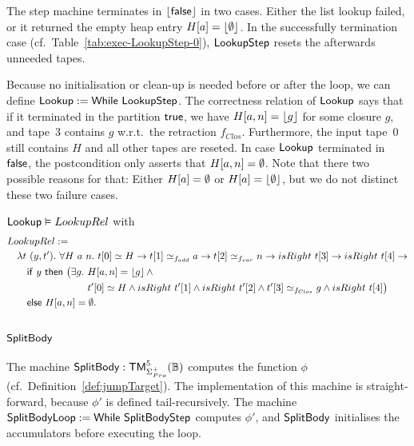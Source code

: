 The step machine terminates in $\left\lfloor {\ensuremath{\mathsf{false}}} \right\rfloor$ in two cases.  Either the list lookup failed, or it returned the empty heap entry $H[a]=\left\lfloor {\emptyset} \right\rfloor$.  In
the successfully termination case (cf.\ Table~\ref{tab:exec-LookupStep-0}), $\mathsf{LookupStep}$ resets the afterwards unneeded tapes.

Because no initialisation or clean-up is needed before or after the loop, we can define $\mathsf{Lookup} := \mathsf{While}~\mathsf{LookupStep}$.  The correctness
relation of $\mathsf{Lookup}$ says that if it terminated in the partition $\mathsf{true}$, we have $H[a,n] = \left\lfloor {g} \right\rfloor$ for some closure $g$, and tape~$3$ contains
$g$ w.r.t.\ the retraction $f_{Clos}$.  Furthermore, the input tape~$0$ still contains $H$ and all other tapes are reseted.  In case $\mathsf{Lookup}$
terminated in $\mathsf{false}$, the postcondition only asserts that $H[a,n]=\emptyset$.  Note that there two possible reasons for that: Either $H[a]=\emptyset$ or
$H[a]=\left\lfloor {\emptyset} \right\rfloor$, but we do not distinct these two failure cases.

\begin{lemma}
  \label{lem:Lookup_Realise}
  $\mathsf{Lookup} \mathrel{\vDash} LookupRel$
  with
  \small
  \begin{alignat*}{1}
    & LookupRel := \\
    &\quad \lambda t~(y, t').~\forall H~a~n.~ t[0] \simeq H \rightarrow t[1] \simeq_{f_{add}} a \rightarrow t[2] \simeq_{f_{var}} n \rightarrow isRight~t[3] \rightarrow isRight~t[4] \rightarrow \\
    &\quad\quad \MS{if}~y~\MS{then}~\bigl(\exists g.~H[a,n] = \Some{g} \land \\
    &\quad\quad \phantom{\MS{if}~y~\MS{then}~\bigl(\exists g.~} t'[0] \simeq H \land isRight~t'[1] \land isRight~t'[2] \land t'[3] \simeq_{f_{Clos}} g \land isRight~t[4]\bigr) \\
    &\quad\quad \MS{else}~ H[a,n] = \None.
\end{alignat*}
\end{lemma}


\subsection{$\mathsf{SplitBody}$}
\label{sec:SplitBody}
%

The machine $\mathsf{SplitBody} : \mathsf{TM}_{\Sigma^+_{Pro}}^5(\mathbb{B})$ computes the function $\phi$ (cf.\ Definition~\ref{def:jumpTarget}).  The
implementation of this machine is straight-forward, because $\phi'$ is defined tail-recursively.  The machine
$\mathsf{SplitBodyLoop} := \mathsf{While}~\mathsf{SplitBodyStep}$ computes $\phi'$, and $\mathsf{SplitBody}$ initialises the accumulators before executing the loop.

